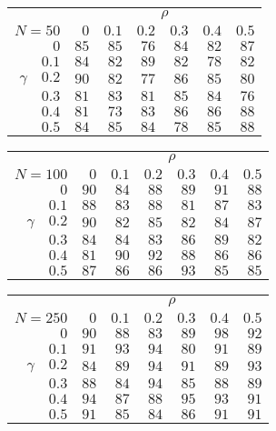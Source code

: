 \begin{tabular}{r|rrrrrr}
\hline\hline
 &\multicolumn{6}{c}{$\rho$} \\ 
 $N = 50$ & $0$ & $0.1$ & $0.2$ & $0.3$ & $0.4$ & $0.5$ \\ 
 \hline$0$ & $85$ & $85$ & $76$ & $84$ & $82$ & $87$\\ 
$0.1$ & $84$ & $82$ & $89$ & $82$ & $78$ & $82$\\ 
$\gamma\quad$$0.2$ & $90$ & $82$ & $77$ & $86$ & $85$ & $80$\\ 
$0.3$ & $81$ & $83$ & $81$ & $85$ & $84$ & $76$\\ 
$0.4$ & $81$ & $73$ & $83$ & $86$ & $86$ & $88$\\ 
$0.5$ & $84$ & $85$ & $84$ & $78$ & $85$ & $88$\\ 
 \hline 
 \end{tabular}
 
 \vspace{2em} 
 
\begin{tabular}{r|rrrrrr}
\hline\hline
 &\multicolumn{6}{c}{$\rho$} \\ 
 $N = 100$ & $0$ & $0.1$ & $0.2$ & $0.3$ & $0.4$ & $0.5$ \\ 
 \hline$0$ & $90$ & $84$ & $88$ & $89$ & $91$ & $88$\\ 
$0.1$ & $88$ & $83$ & $88$ & $81$ & $87$ & $83$\\ 
$\gamma\quad$$0.2$ & $90$ & $82$ & $85$ & $82$ & $84$ & $87$\\ 
$0.3$ & $84$ & $84$ & $83$ & $86$ & $89$ & $82$\\ 
$0.4$ & $81$ & $90$ & $92$ & $88$ & $86$ & $86$\\ 
$0.5$ & $87$ & $86$ & $86$ & $93$ & $85$ & $85$\\ 
 \hline 
 \end{tabular}
 
 \vspace{2em} 
 
\begin{tabular}{r|rrrrrr}
\hline\hline
 &\multicolumn{6}{c}{$\rho$} \\ 
 $N = 250$ & $0$ & $0.1$ & $0.2$ & $0.3$ & $0.4$ & $0.5$ \\ 
 \hline$0$ & $90$ & $88$ & $83$ & $89$ & $98$ & $92$\\ 
$0.1$ & $91$ & $93$ & $94$ & $80$ & $91$ & $89$\\ 
$\gamma\quad$$0.2$ & $84$ & $89$ & $94$ & $91$ & $89$ & $93$\\ 
$0.3$ & $88$ & $84$ & $94$ & $85$ & $88$ & $89$\\ 
$0.4$ & $94$ & $87$ & $88$ & $95$ & $93$ & $91$\\ 
$0.5$ & $91$ & $85$ & $84$ & $86$ & $91$ & $91$\\ 
 \hline 
 \end{tabular}
